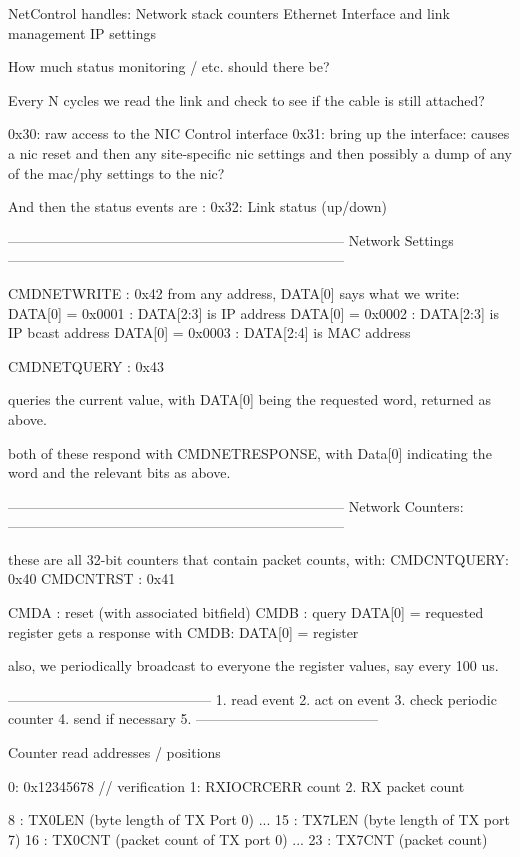NetControl handles: 
   Network stack counters
   Ethernet Interface and link management
   IP settings


How much status monitoring / etc. should there be? 

Every N cycles we read the link and check to see if the cable
is still attached? 

0x30: raw access to the NIC Control interface
0x31: bring up the interface:
    causes a nic reset
    and then any site-specific nic settings
    and then possibly a dump of any of the mac/phy settings to the nic? 

And then the status events are : 
0x32: Link status (up/down)

------------------------------------------------------------------------
Network Settings
------------------------------------------------------------------------

CMDNETWRITE : 0x42
from any address, DATA[0] says what we write:
    DATA[0] = 0x0001 : DATA[2:3] is IP address
    DATA[0] = 0x0002 : DATA[2:3] is IP bcast address
    DATA[0] = 0x0003 : DATA[2:4] is MAC address

CMDNETQUERY : 0x43

queries the current value, with DATA[0] being the requested word,
returned as above.

both of these respond with CMDNETRESPONSE, with Data[0] indicating
the word and the relevant bits as above. 

------------------------------------------------------------------------
Network Counters:
------------------------------------------------------------------------

these are all 32-bit counters that contain packet counts, with: 
CMDCNTQUERY: 0x40
CMDCNTRST : 0x41

CMDA : reset (with associated bitfield)
CMDB : query DATA[0] = requested register
   gets a response with 
   CMDB: DATA[0] = register

   also, we periodically broadcast to everyone the register values,
   say every 100 us.


--------------------------------------------
1. read event
2. act on event
3. check periodic counter
4. send if necessary
5. 
---------------------------------------

Counter read addresses / positions

0: 0x12345678 // verification
1: RXIOCRCERR count
2. RX packet count

8 : TX0LEN (byte length of TX Port 0)
...
15 : TX7LEN (byte length of TX port 7)
16 : TX0CNT (packet count of TX port 0)
...
23 : TX7CNT (packet count)
